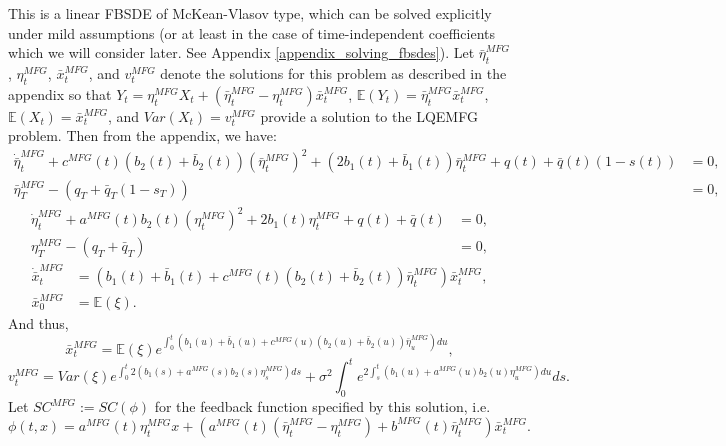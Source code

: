 \documentclass[11pt]{article}
\begin{document}
This is a linear FBSDE of McKean-Vlasov type, which can be solved explicitly under mild assumptions (or at least in the case of time-independent coefficients which we will consider later. See Appendix \ref{appendix_solving_fbsdes}). Let $\bar{\eta}_t^{MFG}$, $\eta_t^{MFG}$, $\bar{x}_t^{MFG}$, and $v^{MFG}_t$ denote the solutions for this problem as described in the appendix so that $Y_t=\eta_t^{MFG}X_t+(\bar{\eta}_t^{MFG}-\eta_t^{MFG})\bar{x}_t^{MFG}$, $\mathbb{E}(Y_t)=\bar{\eta}_t^{MFG}\bar{x}_t^{MFG}$, $\mathbb{E}(X_t)=\bar{x}_t^{MFG}$, and $Var(X_t)=v^{MFG}_t$ provide a solution to the LQEMFG problem. Then from the appendix, we have:
\begin{equation}
\begin{split}
\dot{\bar{\eta}}^{MFG}_t+c^{MFG}(t)(b_2(t)+\bar{b}_2(t)) (\bar{\eta}^{MFG}_t)^2+(2b_1(t)+\bar{b}_1(t)) \bar{\eta}^{MFG}_t +q(t)+\bar{q}(t)(1-s(t))&=0,\\
\bar{\eta}^{MFG}_T-(q_T+\bar{q}_T(1-s_T))&=0,
\end{split}
\label{eq:eta_bar_MFG}
\end{equation}
\begin{equation}
\begin{split}
\dot{\eta}^{MFG}_t+a^{MFG}(t)b_2(t)(\eta^{MFG}_t)^2+2b_1(t)\eta^{MFG}_t+q(t)+\bar{q}(t)&=0, \\
\eta^{MFG}_T-(q_T+\bar{q}_T)&=0,
\end{split}
\end{equation}
\begin{equation}
\begin{split}
\dot{\bar{x}}^{MFG}_t&=(b_1(t)+\bar{b}_1(t)+c^{MFG}(t)(b_2(t)+\bar{b}_2(t))\bar{\eta}^{MFG}_t)\bar{x}^{MFG}_t, \\
\bar{x}^{MFG}_0&=\mathbb{E}(\xi).
\end{split}
\label{eq:x_bar_MFG}
\end{equation}
And thus,
\begin{equation}
\bar{x}^{MFG}_t=\mathbb{E}(\xi) e^{\int_0^t(b_1(u)+\bar{b}_1(u)+c^{MFG}(u)(b_2(u)+\bar{b}_2(u))\bar{\eta}^{MFG}_u)du},
\label{eq:x_bar_MFG_explicit}
\end{equation}
\begin{equation}
v^{MFG}_t=Var(\xi)e^{\int_0^t 2(b_1(s)+a^{MFG}(s)b_2(s)\eta^{MFG}_s)ds}+\sigma^2 \int_0^t e^{2 \int_s^t (b_1(u)+a^{MFG}(u)b_2(u)\eta^{MFG}_u) du}ds.
\label{eq:v_t}
\end{equation}
Let $SC^{MFG}:=SC(\phi)$ for the feedback function specified by this solution, i.e.
\begin{equation*}
    \phi(t,x)=a^{MFG}(t)\eta_t^{MFG}x+\left(a^{MFG}(t)(\bar{\eta}_t^{MFG}-\eta_t^{MFG})+b^{MFG}(t)\bar{\eta}_t^{MFG} \right)\bar{x}_t^{MFG}.
\end{equation*}
\end{document}
